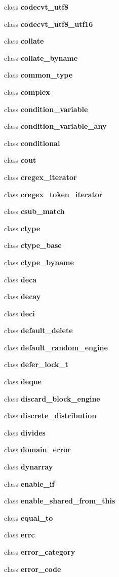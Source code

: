 \begin{DoxyCompactItemize}
\item 
class {\bf codecvt\+\_\+utf8}
\item 
class {\bf codecvt\+\_\+utf8\+\_\+utf16}
\item 
class {\bf collate}
\item 
class {\bf collate\+\_\+byname}
\item 
class {\bf common\+\_\+type}
\item 
class {\bf complex}
\item 
class {\bf condition\+\_\+variable}
\item 
class {\bf condition\+\_\+variable\+\_\+any}
\item 
class {\bf conditional}
\item 
class {\bf cout}
\item 
class {\bf cregex\+\_\+iterator}
\item 
class {\bf cregex\+\_\+token\+\_\+iterator}
\item 
class {\bf csub\+\_\+match}
\item 
class {\bf ctype}
\item 
class {\bf ctype\+\_\+base}
\item 
class {\bf ctype\+\_\+byname}
\item 
class {\bf deca}
\item 
class {\bf decay}
\item 
class {\bf deci}
\item 
class {\bf default\+\_\+delete}
\item 
class {\bf default\+\_\+random\+\_\+engine}
\item 
class {\bf defer\+\_\+lock\+\_\+t}
\item 
class {\bf deque}
\item 
class {\bf discard\+\_\+block\+\_\+engine}
\item 
class {\bf discrete\+\_\+distribution}
\item 
class {\bf divides}
\item 
class {\bf domain\+\_\+error}
\item 
class {\bf dynarray}
\item 
class {\bf enable\+\_\+if}
\item 
class {\bf enable\+\_\+shared\+\_\+from\+\_\+this}
\item 
class {\bf equal\+\_\+to}
\item 
class {\bf errc}
\item 
class {\bf error\+\_\+category}
\item 
class {\bf error\+\_\+code}
\item 

\end{DoxyCompactItemize}
